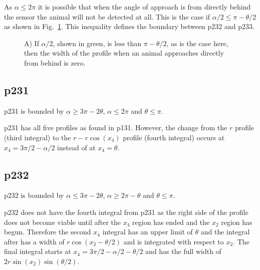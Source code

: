 As $\alpha \le 2\pi$ it is possible that when the angle of approach is from directly behind the sensor the animal will not be detected at all. This is the case if $\alpha/2\le \pi-\theta/2$ as shown in Fig.~\ref{f:p23behind}. This inequality defines the boundary between p232 and p233.

\begin{figure}[t]
        \centering
        \begin{subfigure}[t]{0.4\textwidth}
                \centering
                \caption{}
                \label{f:p23behind}
        \end{subfigure}

\caption{A) If $\alpha/2$, shown in green, is less than $\pi - \theta/2$, as is the case here, then the width of the profile when an animal approaches directly from behind is zero. }
\label{f:p23}
\end{figure}


\subsection{p231} \label{p231}

p231 is bounded by $\alpha \ge 3\pi - 2\theta$, $\alpha \le 2\pi$ and $\theta\le\pi$.

p231 has all five profiles as found in p131. However, the change from the $r$ profile (third integral) to the $r - r\cos(x_4)$ profile (fourth integral) occurs at $x_4 = 3\pi/2 - \alpha/2$ instead of at $x_4 = \theta$. 




\subsection{p232} \label{p232}

p232 is bounded by $\alpha \le 3\pi - 2\theta$, $\alpha\ge 2\pi-\theta$ and $\theta\le\pi$.

p232 does not have the fourth integral from p231 as the right side of the profile does not become viable until after the $x_4$ region has ended and the $x_2$ region has begun. Therefore the second $x_4$ integral has an upper limit of $\theta $ and the integral after has a width of $r\cos(x_2 - \theta/2)$ and is integrated with respect to $x_2$. The final integral starts at $x_4 = 3\pi/2 - \alpha/2 - \theta/2$ and has the full width of $2r\sin(x_2)\sin(\theta/2)$.

